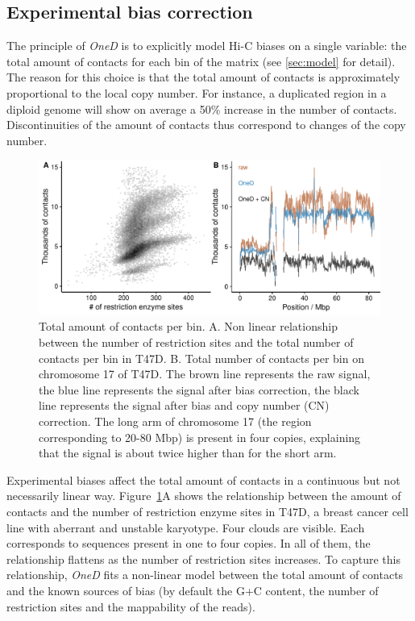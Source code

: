 \documentclass{bioinfo}
\begin{document}
\subsection{Experimental bias correction}

The principle of \textit{OneD} is to explicitly model Hi-C biases on a
single variable: the total amount of contacts for each bin of the matrix
(see \ref{sec:model} for detail). The reason for this choice is that the
total amount of contacts is approximately proportional to the local copy
number. For instance, a duplicated region in a diploid genome will show on
average a 50\% increase in the number of contacts. Discontinuities of the
amount of contacts thus correspond to changes of the copy number.

\begin{figure}
\centerline{\includegraphics[width=.45\textwidth]{img/figure1.pdf}}
\caption{Total amount of contacts per bin. A. Non linear relationship
between the number of restriction sites and the total number of
contacts per bin in T47D. B. Total number of contacts per bin on
chromosome 17 of T47D. The brown line represents the raw
signal, the blue line represents the signal after bias correction, the
black line represents the signal after bias and copy number (CN) correction.
The long arm of chromosome 17 (the region corresponding to 20-80 Mbp) is
present in four copies, explaining that the signal is about twice higher
than for the short arm.}
\label{fig:totals}
\end{figure}


Experimental biases affect the total amount of contacts in a continuous
but not necessarily linear way. Figure~\ref{fig:totals}A shows the
relationship between the amount of contacts and the number of restriction
enzyme sites in T47D, a breast cancer cell line with aberrant and unstable
karyotype.  Four clouds are visible. Each corresponds to sequences present
in one to four copies. In all of them, the relationship flattens as the
number of restriction sites increases. To capture this
relationship, \textit{OneD} fits a non-linear model between the total
amount of contacts and the known sources of bias (by default the G+C
content, the number of restriction sites and the mappability of the
reads).
\end{document}
